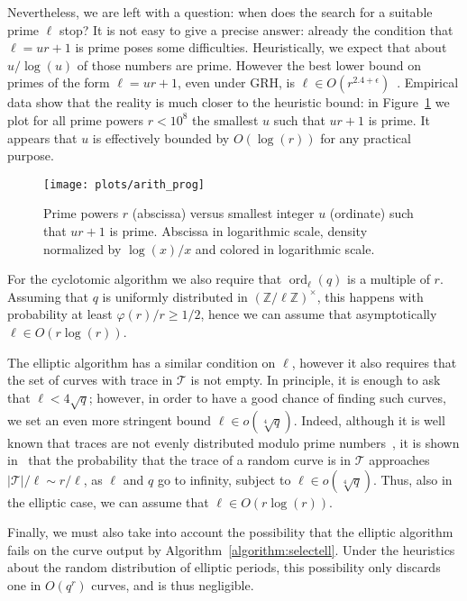 \documentclass{mcom-l}
\theoremstyle{plain}
\theoremstyle{definition}
\newcommand{\abs}[1]{\left\vert#1\right\vert}
\DeclareMathOperator{\order}{ord} %
\newcommand{\Z}{\ensuremath{\mathbb{Z}}}
\newcommand{\euler}{\ensuremath{\varphi}}
\newcounter{algorithm}
\begin{document}
Nevertheless, we are left with a question: when does the search for a
suitable prime $\ell$ stop? %
It is not easy to give a precise answer: already the condition that
$\ell=ur+1$ is prime poses some difficulties. Heuristically, we expect
that about $u/\log(u)$ of those numbers are prime. However the best
lower bound on primes of the form $\ell=ur+1$, even under GRH, is
$\ell\in O(r^{2.4+\epsilon})$~\cite{heath1992zero}. Empirical data
show that the reality is much closer to the heuristic bound: in
Figure~\ref{fig:primes-arith-prog} we plot for all prime powers
$r<10^8$ the smallest $u$ such that $ur+1$ is prime. It appears that
$u$ is effectively bounded by $O(\log(r))$ for any practical purpose.

\begin{figure}
  \centering
  \texttt{[image: plots/arith\_prog]}
  \caption{Prime powers $r$ (abscissa) versus smallest integer $u$
    (ordinate) such that $ur+1$ is prime. Abscissa in logarithmic
    scale, density normalized by $\log(x)/x$ and colored in
    logarithmic scale.}
  \label{fig:primes-arith-prog}
\end{figure}

For the cyclotomic algorithm we also require that $\order_\ell(q)$ is
a multiple of $r$. %
Assuming that $q$ is uniformly distributed in $(\Z/\ell\Z)^\times$,
this happens with probability at least $\euler(r)/r\ge 1/2$, hence we
can assume that asymptotically $\ell\in O(r\log(r))$. %

The elliptic algorithm has a similar condition on $\ell$, however it
also requires that the set of curves with trace in $\mathcal{T}$ is
not empty. %
In principle, it is enough to ask that $\ell<4\sqrt{q}$; however, in
order to have a good chance of finding such curves, we set an even
more stringent bound $\ell\in o(\sqrt[4]{q})$. %
Indeed, although it is well known that traces are not evenly
distributed modulo prime numbers~\cite{lenstra87}, it is shown
in~\cite[Th.~1]{castryck+hubrechts13} that the probability that the
trace of a random curve is in $\mathcal{T}$ approaches
$\abs{\mathcal{T}}/\ell\sim r/\ell$, as $\ell$ and $q$ go to infinity,
subject to $\ell\in o(\sqrt[4]{q})$.  %
Thus, also in the elliptic case, we can assume that
$\ell\in O(r\log(r))$.

Finally, we must also take into account the possibility that the
elliptic algorithm fails on the curve output by
Algorithm~\ref{algorithm:selectell}. %
Under the heuristics about the random distribution of elliptic
periods, this possibility only discards one in $O(q^r)$ curves, and is
thus negligible.
\end{document}
